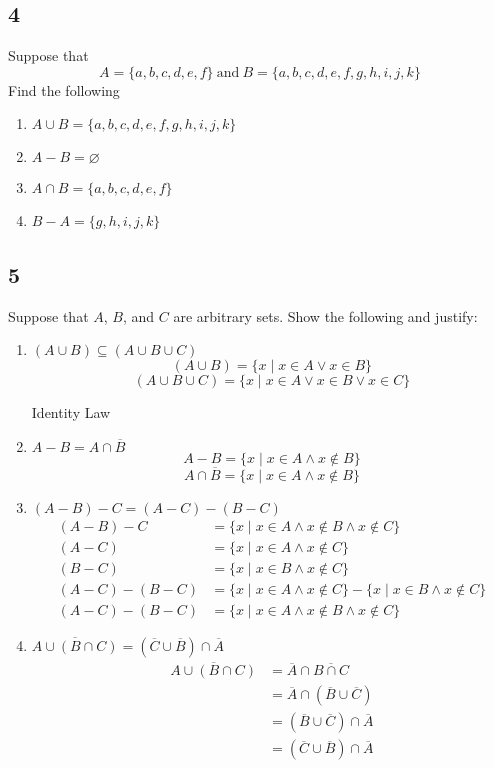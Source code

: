 \documentclass{math}
\begin{document}
\subsection*{4}
Suppose that
\[ A = \{a,b,c,d,e,f\}\ \mathrm{and}\ B = \{a,b,c,d,e,f,g,h,i,j,k\} \]
Find the following
\begin{enumerate}
  \item \( A\cup B = \{a,b,c,d,e,f,g,h,i,j,k\} \)
  \item \( A-B = \varnothing \)
  \item \( A\cap B = \{a,b,c,d,e,f\} \)
  \item \( B-A = \{g,h,i,j,k\} \)
\end{enumerate}

\subsection*{5}
Suppose that \( A \), \( B \), and \( C \) are arbitrary sets. Show the
following and justify:
\begin{enumerate}
  \item \( (A\cup B) \subseteq (A\cup B\cup C) \)
  \[ (A\cup B) = \{x\mid x \in A \vee x \in B \} \]
  \[ (A\cup B\cup C) = \{x\mid x \in A \vee x \in B \vee x \in C\} \]
  \begin{center}
    Identity Law
  \end{center}
  \item \( A-B = A\cap \overline{B} \)
  \[ A-B = \{x\mid x \in A \wedge x \notin B\} \]
  \[ A\cap \overline{B} = \{x\mid x \in A \wedge x \notin B\} \]
  \item \( (A-B)-C = (A-C)-(B-C) \)
  \begin{align*}
    (A-B)-C &= \{x\mid x \in A \wedge x \notin B \wedge x \notin C\} \\
    (A-C) &= \{x\mid x \in A \wedge x \notin C\} \\
    (B-C) &= \{x\mid x \in B \wedge x \notin C\} \\
    (A-C)-(B-C) &= \{x\mid x \in A \wedge x \notin C\}-
     \{x\mid x \in B \wedge x \notin C\} \\
    (A-C)-(B-C) &= \{x\mid x \in A \wedge x \notin B \wedge x \notin C\}
  \end{align*}
  \item \( \overline{A \cup (B \cap C)} = (\overline{C} \cup \overline{B}) \cap
     \overline{A} \)
  \begin{align*}
    \overline{A \cup (B \cap C)} &=
      \overline{A} \cap \overline{B \cap C} \\
    &= \overline{A} \cap (\overline{B} \cup \overline{C}) \\
    &= (\overline{B} \cup \overline{C}) \cap \overline{A} \\
    &= (\overline{C} \cup \overline{B}) \cap \overline{A}
  \end{align*}
\end{enumerate}
\end{document}
